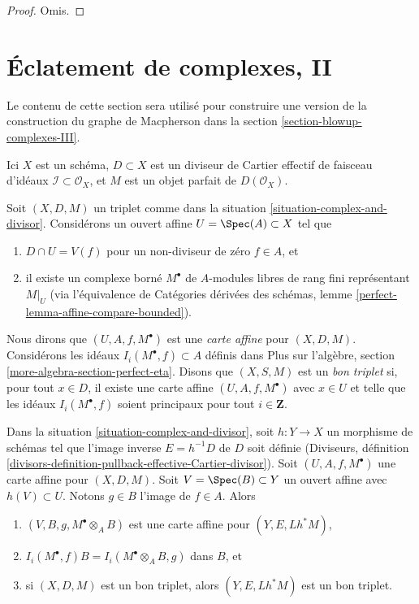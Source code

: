 \begin{proof}
Omis.
\end{proof}





\section{Éclatement de complexes, II}
\label{section-blowup-complexes-II}

\noindent
Le contenu de cette section sera utilisé pour construire une version de la
construction du graphe de Macpherson dans la section \ref{section-blowup-complexes-III}.
 
\begin{situation}
\label{situation-complex-and-divisor}
Ici $X$ est un schéma, $D \subset X$ est un diviseur de Cartier effectif
de faisceau d'idéaux $\mathcal{I} \subset \mathcal{O}_X$, et
$M$ est un objet parfait de $D(\mathcal{O}_X)$.
\end{situation}

\noindent
Soit $(X, D, M)$ un triplet comme dans la
situation \ref{situation-complex-and-divisor}.
Considérons un ouvert affine $U = \Spec(A) \subset X$
tel que
\begin{enumerate}
\item $D \cap U = V(f)$ pour un non-diviseur de zéro $f \in A$, et
\item il existe un complexe borné $M^\bullet$ de
$A$-modules libres de rang fini représentant $M|_U$ (via l'équivalence de
Catégories dérivées des schémas, lemme
\ref{perfect-lemma-affine-compare-bounded}).
\end{enumerate}
Nous dirons que $(U, A, f, M^\bullet)$ est une
{\it carte affine} pour $(X, D, M)$.
Considérons les idéaux $I_i(M^\bullet, f) \subset A$ définis dans
Plus sur l'algèbre, section \ref{more-algebra-section-perfect-eta}.
Disons que $(X, S, M)$ est un {\it bon triplet} si, pour tout $x \in D$,
il existe une carte affine $(U, A, f, M^\bullet)$
avec $x \in U$ et telle que les idéaux $I_i(M^\bullet, f)$ soient principaux pour tout
$i \in \mathbf{Z}$.

\begin{lemma}
\label{lemma-pullback-triple-ideals-good}
Dans la situation \ref{situation-complex-and-divisor}, soit $h : Y \to X$ un
morphisme de schémas tel que l'image inverse $E = h^{-1}D$ de $D$
soit définie (Diviseurs, définition
\ref{divisors-definition-pullback-effective-Cartier-divisor}).
Soit $(U, A, f, M^\bullet)$ une carte affine pour $(X, D, M)$.
Soit $V = \Spec(B) \subset Y$ un ouvert affine avec $h(V) \subset U$.
Notons $g \in B$ l'image de $f \in A$.
Alors
\begin{enumerate}
\item $(V, B, g, M^\bullet \otimes_A B)$ est une carte affine pour $(Y, E, Lh^*M)$,
\item $I_i(M^\bullet, f)B = I_i(M^\bullet \otimes_A B, g)$ dans $B$, et
\item si $(X, D, M)$ est un bon triplet, alors
$(Y, E, Lh^*M)$ est un bon triplet.
\end{enumerate}
\end{lemma}

